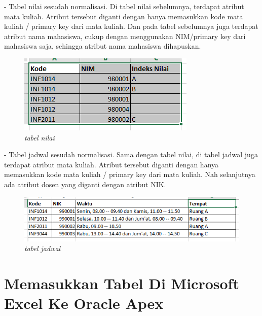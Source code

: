\begin{enumerate}
    - Tabel nilai sesudah normalisasi. Di tabel nilai sebelumnya, terdapat atribut mata kuliah. Atribut tersebut diganti dengan hanya memasukkan kode mata kuliah / primary key dari mata kuliah. Dan pada tabel sebelumnya juga terdapat atribut nama mahasiswa, cukup dengan menggunakan NIM/primary key dari mahasiswa saja, sehingga atribut nama mahasiswa dihapuskan.\par
    
    \begin{figure}[!htbp]
        \centering
        \includegraphics[scale=0.7]{figure/tabel_nilai.PNG}
        \caption{\textit{tabel nilai}}
        \label{fig:my_label}
    \end{figure}\par
    
    - Tabel jadwal sesudah normalisasi. Sama dengan tabel nilai, di tabel jadwal juga terdapat atribut mata kuliah. Atribut tersebut diganti dengan hanya memasukkan kode mata kuliah / primary key dari mata kuliah. Nah selanjutnya ada atribut dosen yang diganti dengan atribut NIK.\par
    
    \begin{figure}[!htbp]
        \centering
        \includegraphics[scale=0.7]{figure/tabel_jadwal.PNG}
        \caption{\textit{tabel jadwal}}
        \label{fig:my_label}
    \end{figure}
    \end{enumerate}
    
\section{Memasukkan Tabel Di Microsoft Excel Ke Oracle Apex}

